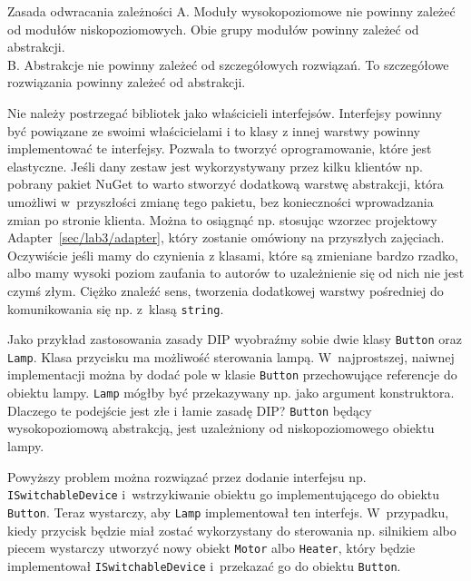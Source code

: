 \begin{myboxWithTitle}{Zasada odwracania zależności}
	A. Moduły wysokopoziomowe nie powinny zależeć od modułów niskopoziomowych. Obie grupy modułów powinny zależeć od abstrakcji.\\
	B. Abstrakcje nie powinny zależeć od szczegółowych rozwiązań. To szczegółowe rozwiązania powinny zależeć od abstrakcji.
\end{myboxWithTitle}

Nie należy postrzegać bibliotek jako właścicieli interfejsów. Interfejsy powinny być powiązane ze swoimi właścicielami i to klasy z innej warstwy powinny implementować te interfejsy. %
Pozwala to tworzyć oprogramowanie, które jest elastyczne. Jeśli dany zestaw jest wykorzystywany przez kilku klientów np. pobrany pakiet NuGet to warto stworzyć dodatkową warstwę abstrakcji, która umożliwi w~przyszłości zmianę tego pakietu, bez konieczności wprowadzania zmian po stronie klienta. Można to osiągnąć np. stosując wzorzec projektowy Adapter~\ref{sec/lab3/adapter}, który zostanie omówiony na przyszłych zajęciach. Oczywiście jeśli mamy do czynienia z klasami, które są zmieniane bardzo rzadko, albo mamy wysoki poziom zaufania to autorów to uzależnienie się od nich nie jest czymś złym. Ciężko znaleźć sens, tworzenia dodatkowej warstwy pośredniej do komunikowania się np. z~klasą \texttt{string}.

Jako przykład zastosowania zasady DIP wyobraźmy sobie dwie klasy \texttt{Button} oraz \texttt{Lamp}. Klasa przycisku ma możliwość sterowania lampą. W~najprostszej, naiwnej implementacji można by dodać pole w klasie \texttt{Button} przechowujące referencje do obiektu lampy. \texttt{Lamp} mógłby być przekazywany np. jako argument konstruktora. Dlaczego te podejście jest złe i łamie zasadę DIP? \texttt{Button} będący wysokopoziomową abstrakcją, jest uzależniony od niskopoziomowego obiektu lampy.

Powyższy problem można rozwiązać przez dodanie interfejsu np. \texttt{ISwitchableDevice} i~wstrzykiwanie obiektu go implementującego do obiektu \texttt{Button}. Teraz wystarczy, aby \texttt{Lamp} implementował ten interfejs. W~przypadku, kiedy przycisk będzie miał zostać wykorzystany do sterowania np. silnikiem albo piecem wystarczy utworzyć nowy obiekt \texttt{Motor} albo \texttt{Heater}, który będzie implementował \texttt{ISwitchableDevice} i~przekazać go do obiektu \texttt{Button}.

